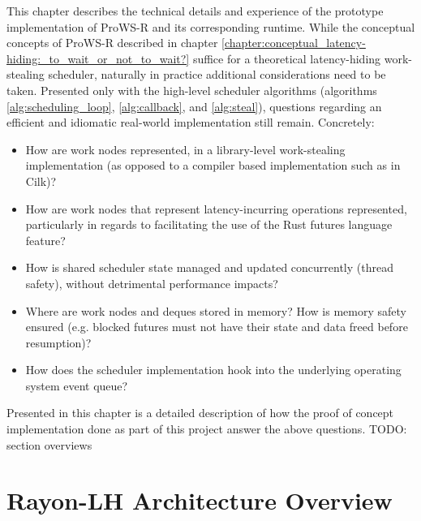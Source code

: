 \documentclass[bsc,frontabs,singlespacing,parskip,deptreport,normalheadings]{infthesis}
\begin{document}
This chapter describes the technical details and experience of the prototype
implementation of ProWS-R and its corresponding runtime. While the conceptual
concepts of ProWS-R described in chapter
\ref{chapter:conceptual_latency-hiding:_to_wait_or_not_to_wait?} suffice for a
theoretical latency-hiding work-stealing scheduler, naturally in practice
additional considerations need to be taken. Presented only with the high-level
scheduler algorithms (algorithms \ref{alg:scheduling_loop}, \ref{alg:callback},
and \ref{alg:steal}), questions regarding an efficient and idiomatic real-world
implementation still remain. Concretely:

\begin{itemize}
    \item How are work nodes represented, in a library-level work-stealing
        implementation (as opposed to a compiler based implementation such as in
        Cilk)?
    \item How are work nodes that represent latency-incurring operations
        represented, particularly in regards to facilitating the use of the Rust
        futures language feature?
    \item How is shared scheduler state managed and updated concurrently (thread
        safety), without detrimental performance impacts?
    \item Where are work nodes and deques stored in memory? How is memory safety
        ensured (e.g. blocked futures must not have their state and data freed
        before resumption)?
    \item How does the scheduler implementation hook into the underlying
        operating system event queue?
\end{itemize}

Presented in this chapter is a detailed description of how the proof of concept
implementation done as part of this project answer the above questions. TODO:
section overviews

\section{Rayon-LH Architecture Overview}
\label{section:rayon-lh_architecture_overview}
\end{document}
